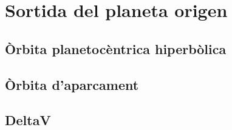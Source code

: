 \chapter{Sortida del planeta origen}

\section{Òrbita planetocèntrica hiperbòlica}
\section{Òrbita d'aparcament}
\section{DeltaV}
